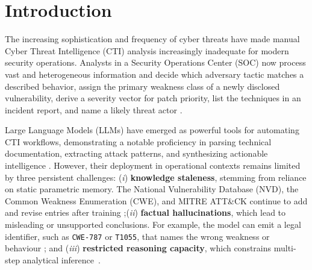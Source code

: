 \documentclass[5p,times,authoryear]{elsarticle}
\begin{document}

\section{Introduction}
\label{sec:intro}
The increasing sophistication and frequency of cyber threats have made manual Cyber Threat Intelligence (CTI) analysis increasingly inadequate for modern security
operations. Analysts in a Security Operations Center (SOC) now process vast and heterogeneous information and decide which adversary tactic matches a described behavior, assign the primary weakness class of a newly disclosed vulnerability, derive a severity vector for patch priority, list the techniques in an incident report, and name a likely threat actor \citeyearpar{tounsi2018survey, siracusano2023action}. 




Large Language Models (LLMs) have emerged as powerful tools for automating CTI workflows, demonstrating a notable proficiency in parsing technical documentation, extracting attack patterns, and synthesizing actionable intelligence \citep{ferrag2024generative,xu2024llm4sec, siracusano2023action}. However, their deployment in operational contexts remains limited by three persistent challenges: (\textit{i}) \textbf{knowledge staleness}, stemming from reliance on static parametric memory. The National Vulnerability Database (NVD), the Common Weakness Enumeration (CWE), and MITRE ATT\&CK continue to add and revise entries after training \citep{nvd2024,mitre2024cwe,mitre2024attack};(\textit{ii}) \textbf{factual hallucinations}, which lead to misleading or unsupported conclusions. For example, the model can emit a legal identifier, such as \texttt{CWE-787} or \texttt{T1055}, that names the wrong weakness or behaviour \citep{ferrag2024generative,alam2024ctibench,ji2023survey}; and (\textit{iii}) \textbf{restricted reasoning capacity}, which constrains multi-step analytical inference~\cite{alam2024ctibench}.
\end{document}
